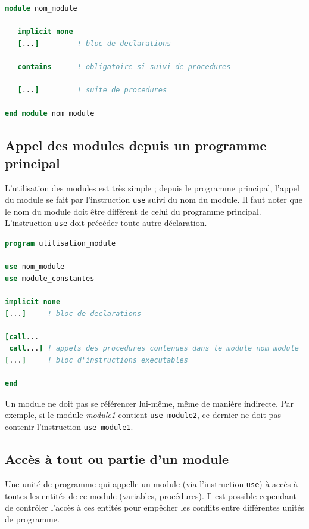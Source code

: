 \documentclass[a4paper,twoside]{article}
\begin{document}
\begin{lstlisting}[language=Fortran]
module nom_module
   
   implicit none 
   [...]         ! bloc de declarations 

   contains      ! obligatoire si suivi de procedures
   
   [...]         ! suite de procedures
 
end module nom_module
\end{lstlisting}

\subsection{Appel des modules depuis un programme principal}
L'utilisation des modules est très simple ; depuis le programme principal, l'appel du module se fait par l'instruction \texttt{use} suivi du nom du module. Il faut noter que le nom du module doit être différent de celui du programme principal. L'instruction \texttt{use} doit précéder toute autre déclaration.

\begin{lstlisting}[language=Fortran]
program utilisation_module

use nom_module 
use module_constantes

implicit none 
[...]     ! bloc de declarations

[call...
 call...] ! appels des procedures contenues dans le module nom_module
[...]     ! bloc d'instructions executables
 
end 
\end{lstlisting}

\begin{remarque}
Un module ne doit pas se référencer lui-même, même de manière indirecte. Par exemple, si le module \emph{module1} contient \texttt{use module2}, ce dernier ne doit pas contenir l'instruction \texttt{use module1}.
\end{remarque}

\subsection{Accès à tout ou partie d'un module}

Une unité de programme qui appelle un module (via l'instruction \texttt{use}) à accès à toutes les entités de ce module (variables, procédures). Il est possible cependant de contrôler l'accès à ces entités pour empêcher les conflits entre différentes unités de programme.
\end{document}
